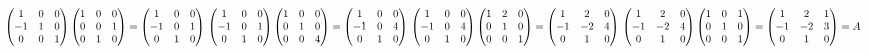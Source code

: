\documentclass{article}
\begin{document}
\(
\begin{pmatrix}
1&0&0\\-1&1&0\\0&0&1
\end{pmatrix}
\begin{pmatrix}
    1&0&0\\0&0&1\\0&1&0
\end{pmatrix}
= 
\begin{pmatrix}
1&0&0\\
-1&0&1\\
0&1&0
\end{pmatrix}
\\\\\\
\begin{pmatrix}
1&0&0\\-1&0&1\\0&1&0
\end{pmatrix}
\begin{pmatrix}
1&0&0\\0&1&0\\0&0&4
\end{pmatrix}
=
\begin{pmatrix}
1&0&0\\
-1&0&4\\
0&1&0
\end{pmatrix}
\\\\\\
\begin{pmatrix}
1&0&0\\-1&0&4\\0&1&0
\end{pmatrix}
\begin{pmatrix}
1&2&0\\0&1&0\\0&0&1
\end{pmatrix}
=
\begin{pmatrix}
1&2&0\\
-1&-2&4\\
0&1&0
\end{pmatrix}
\\\\\\
\begin{pmatrix}
1&2&0\\-1&-2&4\\0&1&0
\end{pmatrix}
\begin{pmatrix}
1&0&1\\0&1&0\\0&0&1
\end{pmatrix}
=
\begin{pmatrix}
1&2&1\\
-1&-2&3\\
0&1&0
\end{pmatrix}
= A
\)
\end{document}
